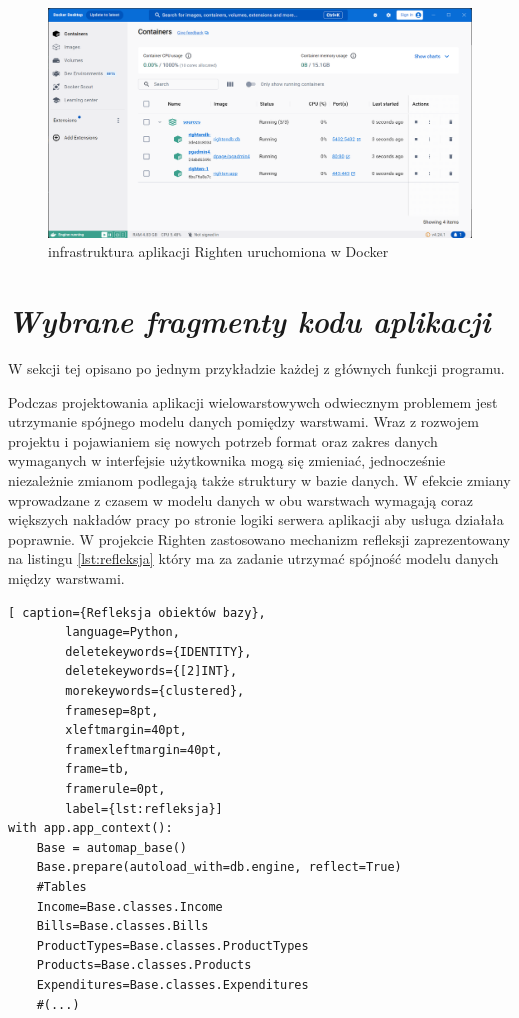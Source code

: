 \documentclass[a4paper,10pt, twoside]{report}
\newcommand{\customstylesection}[1]{\textbf{\textit{#1}}}
\begin{document}
\begin{large}
\begin{figure}[H]           %
    \centering
    \includegraphics[width=12cm]{figures/Righten_environment_docker.png}
    \caption{infrastruktura aplikacji Righten uruchomiona w Docker}
    \label{fig:rightenenvironmentdocker}
\end{figure}

\section{\customstylesection{Wybrane fragmenty kodu aplikacji}}
{W sekcji tej opisano po jednym przykładzie każdej z głównych funkcji programu.}

{Podczas projektowania aplikacji wielowarstowywch odwiecznym problemem jest 
utrzymanie spójnego modelu danych pomiędzy warstwami. Wraz z rozwojem projektu i
 pojawianiem się nowych potrzeb format oraz zakres danych wymaganych w 
interfejsie użytkownika mogą się zmieniać, jednocześnie niezależnie zmianom 
podlegają także struktury w bazie danych. W efekcie zmiany wprowadzane z czasem 
w modelu danych w obu warstwach wymagają coraz większych nakładów pracy po 
stronie logiki serwera aplikacji aby usługa działała poprawnie. W projekcie 
Righten zastosowano mechanizm refleksji \cite{refleksja} zaprezentowany na 
listingu \ref*{lst:refleksja} który ma za zadanie utrzymać spójność modelu 
danych między warstwami.}

\begin{minipage}{\textwidth}
    \begin{lstlisting}[ caption={Refleksja obiektów bazy},
        language=Python,
        deletekeywords={IDENTITY},
        deletekeywords={[2]INT},
        morekeywords={clustered},
        framesep=8pt,
        xleftmargin=40pt,
        framexleftmargin=40pt,
        frame=tb,
        framerule=0pt,
        label={lst:refleksja}]
with app.app_context():
    Base = automap_base() 
    Base.prepare(autoload_with=db.engine, reflect=True)
    #Tables
    Income=Base.classes.Income
    Bills=Base.classes.Bills
    ProductTypes=Base.classes.ProductTypes
    Products=Base.classes.Products
    Expenditures=Base.classes.Expenditures
    #(...)


\end{lstlisting}
\end{minipage}
\end{large}
\end{document}
